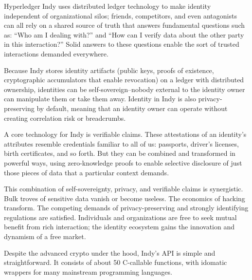 Hyperledger Indy uses distributed ledger technology to make identity independent of organizational silos; friends, competitors, and even antagonists can all rely on a shared source of truth that answers fundamental questions such as: ``Who am I dealing with?'' and ``How can I verify data about the other party in this interaction?'' Solid answers to these questions enable the sort of trusted interactions demanded everywhere.

Because Indy stores identity artifacts (public keys, proofs of existence, cryptographic accumulators that enable revocation) on a ledger with distributed ownership, identities can be self-sovereign--nobody external to the identity owner can manipulate them or take them away. Identity in Indy is also privacy-preserving by default, meaning that an identity owner can operate without creating correlation risk or breadcrumbs.

A core technology for Indy is verifiable claims. These attestations of an identity's attributes resemble credentials familiar to all of us: passports, driver’s licenses, birth certificates, and so forth. But they can be combined and transformed in powerful ways, using zero-knowledge proofs to enable selective disclosure of just those pieces of data that a particular context demands.

This combination of self-sovereignty, privacy, and verifiable claims is synergistic. Bulk troves of sensitive data vanish or become useless. The economics of hacking transform. The competing demands of privacy-preserving and strongly identifying regulations are satisfied. Individuals and organizations are free to seek mutual benefit from rich interaction; the identity ecosystem gains the innovation and dynamism of a free market. 

Despite the advanced crypto under the hood, Indy’s API is simple and straightforward. It consists of about 50 C-callable functions, with idomatic wrappers for many mainstream programming languages. 

